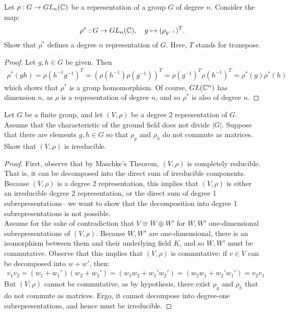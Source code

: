 \documentclass[num=4,duedate=03-03-21,course=Algebra\ II,proflastname=Walton]{hwtemplate}
\begin{document}
\problem[4]
\begin{claim}
	Let \(\rho:G\to GL_n(\mathbb{C})\) be a representation of a group \(G\) of degree \(n\). Consider the map:
	\begin{align*}
		\rho^{*}:G\to GL_n(\mathbb{C}), \quad g \mapsto (\rho_{g^{-1}})^{T}.
	\end{align*}
	Show that \(\rho^{*}\) defines a degree \(n\) representation of \(G\). Here, \(T\) stands for transpose.
\end{claim}
\begin{proof}
	Let \(g,h \in G\) be given. Then
	\begin{align*}
		\rho^{*}(gh) = \rho(h^{-1}g^{-1})^{T} = (\rho(h^{-1})\rho(g^{-1}))^{T} = \rho(g^{-1})^{T}\rho(h^{-1})^{T} = \rho^{*}(g)\rho^{*}(h)
	\end{align*}
	which shows that \(\rho^{*}\) is a group homomorphism. Of course, \(GL(\mathbb{C}^{n})\) has dimension \(n\), as  \(\rho\) is a representation of degree \(n\), and so \(\rho^{*}\) is also of degree \(n\).
\end{proof}

\problem[5]
\begin{claim}
	Let \(G\) be a finite group, and let \((V,\rho)\) be a degree \(2\) representation of \(G\). Assume that the characteristic of the ground field does not divide \(\left| G \right| \). Suppose that there are elements \(g,h \in G\) so that \(\rho_g\) and \(\rho_h\) do not commute as matrices. Show that \((V,\rho)\) is irreducible.
\end{claim}
\begin{proof}
	First, observe that by Maschke's Theorem, \((V,\rho)\) is completely reducible. That is, it can be decomposed into the direct sum of irreducible components. Because \((V,\rho)\) is a degree 2 representation, this implies that \((V,\rho)\) is either an irreducible degree 2 representation, or the direct sum of degree 1 subrepresentations-- we want to show that the decomposition into degree 1 subrepresentations is not possible.\\

	Assume for the sake of contradiction that \(V \cong W \oplus W'\) for \(W,W'\) one-dimensional subrepresentations of \((V,\rho)\). Because \(W,W'\) are one-dimensional, there is an isomorphism between them and their underlying field \(K\), and so \(W,W'\) must be commutative. Observe that this implies that \((V,\rho)\) is commutative: if \(v \in V\) can be decomposed into \(w+w'\), then:
	\begin{align*}
		v_1v_2 = (w_1+w_1')(w_2+w_2') = (w_1w_2 + w_1'w_2') = (w_2w_1 + w_2'w_1') = v_2v_1
	\end{align*}
	But \((V,\rho)\) cannot be commutative, as by hypothesis, there exist \(\rho_g\) and \(\rho_h\) that do not commute as matrices. Ergo, it cannot decompose into degree-one subrepresentations, and hence must be irreducible.
\end{proof}
\end{document}
